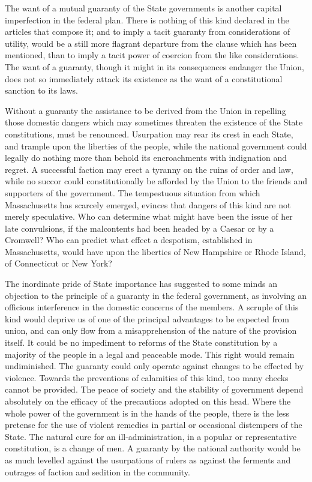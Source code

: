 The want of a mutual guaranty of the State governments is another capital imperfection in the federal plan. There is nothing of this kind declared in the articles that compose it; and to imply a tacit guaranty from considerations of utility, would be a still more flagrant departure from the clause which has been mentioned, than to imply a tacit power of coercion from the like considerations. The want of a guaranty, though it might in its consequences endanger the Union, does not so immediately attack its existence as the want of a constitutional sanction to its laws.

Without a guaranty the assistance to be derived from the Union in repelling those domestic dangers which may sometimes threaten the existence of the State constitutions, must be renounced. Usurpation may rear its crest in each State, and trample upon the liberties of the people, while the national government could legally do nothing more than behold its encroachments with indignation and regret. A successful faction may erect a tyranny on the ruins of order and law, while no succor could constitutionally be afforded by the Union to the friends and supporters of the government. The tempestuous situation from which Massachusetts has scarcely emerged, evinces that dangers of this kind are not merely speculative. Who can determine what might have been the issue of her late convulsions, if the malcontents had been headed by a Caesar or by a Cromwell? Who can predict what effect a despotism, established in Massachusetts, would have upon the liberties of New Hampshire or Rhode Island, of Connecticut or New York?

The inordinate pride of State importance has suggested to some minds an objection to the principle of a guaranty in the federal government, as involving an officious interference in the domestic concerns of the members. A scruple of this kind would deprive us of one of the principal advantages to be expected from union, and can only flow from a misapprehension of the nature of the provision itself. It could be no impediment to reforms of the State constitution by a majority of the people in a legal and peaceable mode. This right would remain undiminished. The guaranty could only operate against changes to be effected by violence. Towards the preventions of calamities of this kind, too many checks cannot be provided. The peace of society and the stability of government depend absolutely on the efficacy of the precautions adopted on this head. Where the whole power of the government is in the hands of the people, there is the less pretense for the use of violent remedies in partial or occasional distempers of the State. The natural cure for an ill-administration, in a popular or representative constitution, is a change of men. A guaranty by the national authority would be as much levelled against the usurpations of rulers as against the ferments and outrages of faction and sedition in the community.

